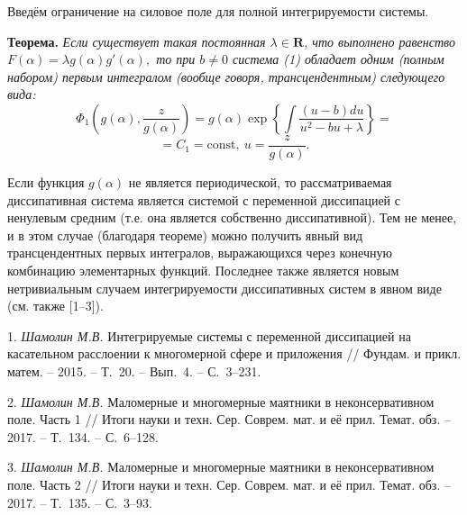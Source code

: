 Введём ограничение на силовое поле для полной интегрируемости
системы.

\textbf{Теорема.} {\it
Если существует такая постоянная
$\lambda\in\mathbf{R}$, что выполнено равенство
$
F(\alpha)=\lambda g(\alpha)g'(\alpha),
$
то при $b\ne 0$ система (1) обладает одним (полным набором) первым
интегралом (вообще говоря, трансцендентным) следующего вида:
$$
\Phi_1\left(g(\alpha),\frac{z}{g(\alpha)}\right)=g(\alpha)\exp\left\{\int\frac{(u-b)du}{u^2-bu+\lambda}\right\}=
$$
$$=C_1=\textrm{const},~u=\frac{z}{g(\alpha)}.$$
}

Если функция $g(\alpha)$ не является периодической, то
рассматриваемая диссипативная система является системой с переменной
диссипацией с ненулевым средним (т.е. она является собственно
диссипативной). Тем не менее, и в этом случае (благодаря теореме)
можно получить явный вид трансцендентных первых интегралов,
выражающихся через конечную комбинацию элементарных функций.
Последнее также является новым нетривиальным случаем интегрируемости
диссипативных систем в явном виде (см. также [1--3]).






\litlist

1. {\it Шамолин М.В.} Интегрируемые системы с переменной диссипацией
на касательном расслоении к многомерной сфере и приложения //
Фундам. и прикл. матем. -- 2015. -- Т.~20. -- Вып.~4. -- С.~3--231.

2. {\it Шамолин М.В.} Маломерные и многомерные маятники в
неконсервативном поле. Часть 1 // Итоги науки и техн. Сер. Соврем.
мат. и её прил. Темат. обз. -- 2017. -- Т.~134. -- С.~6--128.

3. {\it Шамолин М.В.} Маломерные и многомерные маятники в
неконсервативном поле. Часть 2 // Итоги науки и техн. Сер. Соврем.
мат. и её прил. Темат. обз. -- 2017. -- Т.~135. -- С.~3--93.








